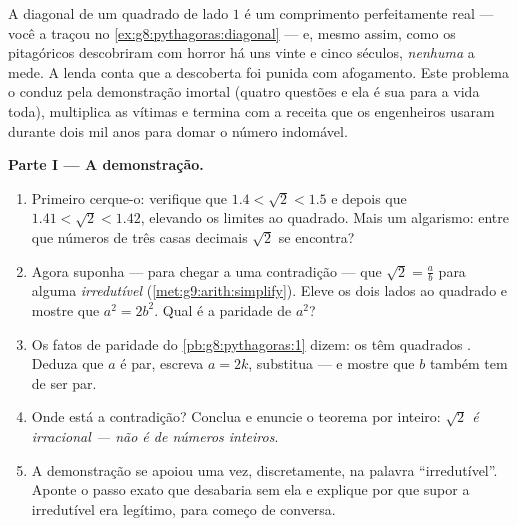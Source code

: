 \begin{problem}
\label{pb:g9:sqrt:1}
A diagonal de um quadrado de lado $1$ é um comprimento perfeitamente
real --- você a traçou no \cref{ex:g8:pythagoras:diagonal} --- e, mesmo
assim, como os pitagóricos descobriram com horror há uns vinte e cinco
séculos, \emph{ nenhuma} a mede. A lenda conta que a descoberta
foi punida com afogamento. Este problema o conduz pela demonstração
imortal (quatro questões e ela é sua para a vida toda), multiplica as
vítimas e termina com a receita que os engenheiros usaram durante dois
mil anos para domar o número indomável.

\medskip
\noindent\textbf{Parte I --- A demonstração.}
\begin{enumerate}
  \item Primeiro cerque-o: verifique que $1.4 < \sqrt2 < 1.5$ e depois
        que $1.41 < \sqrt2 < 1.42$, elevando os limites ao quadrado.
        Mais um algarismo: entre que números de três casas decimais
        $\sqrt2$ se encontra?
  \item Agora suponha --- para chegar a uma contradição --- que
        $\sqrt2 = \frac ab$ para alguma  \emph{irredutível}
        (\cref{met:g9:arith:simplify}). Eleve os dois lados ao quadrado
        e mostre que $a^2 = 2 b^2$. Qual é a paridade de $a^2$?
  \item Os fatos de paridade do \cref{pb:g8:pythagoras:1} dizem: os
         têm quadrados . Deduza que $a$ é par,
        escreva $a = 2k$, substitua --- e mostre que $b$ também tem de
        ser par.
  \item Onde está a contradição? Conclua e enuncie o teorema por
        inteiro: \emph{$\sqrt2$ é irracional --- não é  de
        números inteiros}.
  \item A demonstração se apoiou uma vez, discretamente, na palavra
        ``irredutível''. Aponte o passo exato que desabaria sem ela e
        explique por que supor a  irredutível era legítimo, para
        começo de conversa.
\end{enumerate}


\end{problem}
